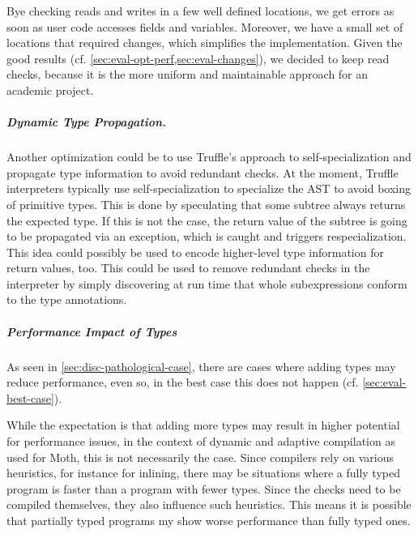 Bye checking reads and writes in a few well defined locations,
we get errors as soon as user code accesses fields and variables.
Moreover, we have a small set of locations that required changes,
which simplifies the implementation.
Given the good
results (cf. \cref{sec:eval-opt-perf,sec:eval-changes}), we decided to keep read checks, because it is the more uniform and maintainable
approach for an academic project.


\subparagraph{Dynamic Type Propagation.}
Another optimization could be to use Truffle's approach to 
self-specialization\citep{Wurthinger:2012:SelfOptAST}
and propagate type information to avoid redundant checks.
At the moment, Truffle interpreters typically use self-specialization to 
specialize the AST to avoid boxing of primitive types.
This is done by speculating that some subtree always returns the expected type.
If this is not the case, the return value of the subtree is going to be
propagated via an exception, which is caught and triggers respecialization.
This idea could possibly be used to encode higher-level type information for
return values, too.
This could be used to remove redundant checks in the interpreter
by simply discovering at run time that whole subexpressions conform to the
type annotations.

\subparagraph{Performance Impact of Types}

As seen in \cref{sec:disc-pathological-case},
there are cases where adding types may reduce performance,
even so, in the best case this does not happen (cf. \cref{sec:eval-best-case}).

While the expectation is that adding more types may result in higher potential
for performance issues, in the context of dynamic and adaptive compilation
as used for Moth, this is not necessarily the case.
Since compilers rely on various heuristics, for instance for inlining,
there may be situations where a fully typed program is faster than
a program with fewer types.
Since the checks need to be compiled themselves, they also influence such heuristics.
This means it is possible that
partially typed programs my show worse performance than fully typed ones.

